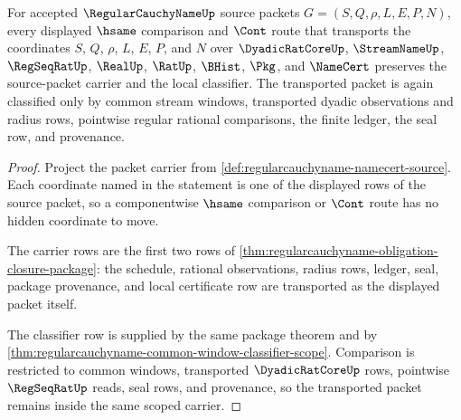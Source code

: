 \begin{theorem}
\label{thm:regularcauchyname-scoped-carrier-transport}
For accepted $\RegularCauchyNameUp$ source packets $G=(S,Q,\rho,L,E,P,N)$, every displayed $\hsame$ comparison and $\Cont$ route that transports the coordinates $S$, $Q$, $\rho$, $L$, $E$, $P$, and $N$ over $\DyadicRatCoreUp$, $\StreamNameUp$, $\RegSeqRatUp$, $\RealUp$, $\RatUp$, $\BHist$, $\Pkg$, and $\NameCert$ preserves the source-packet carrier and the local classifier. The transported packet is again classified only by common stream windows, transported dyadic observations and radius rows, pointwise regular rational comparisons, the finite ledger, the seal row, and provenance.
\end{theorem}
\begin{proof}
Project the packet carrier from \autoref{def:regularcauchyname-namecert-source}. Each coordinate named in the statement is one of the displayed rows of the source packet, so a componentwise $\hsame$ comparison or $\Cont$ route has no hidden coordinate to move.

The carrier rows are the first two rows of \autoref{thm:regularcauchyname-obligation-closure-package}: the schedule, rational observations, radius rows, ledger, seal, package provenance, and local certificate row are transported as the displayed packet itself.

The classifier row is supplied by the same package theorem and by \autoref{thm:regularcauchyname-common-window-classifier-scope}. Comparison is restricted to common windows, transported $\DyadicRatCoreUp$ rows, pointwise $\RegSeqRatUp$ reads, seal rows, and provenance, so the transported packet remains inside the same scoped carrier.
\end{proof}

